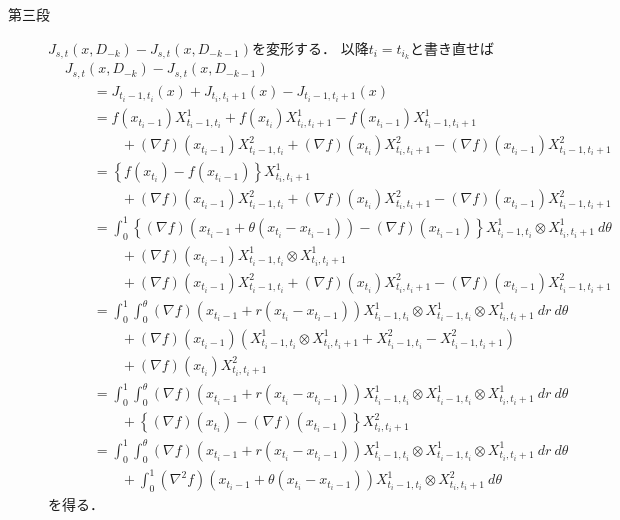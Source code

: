\begin{prf}
\begin{description}
			\item[第三段]
				$J_{s,t}(x,D_{-k}) - J_{s,t}(x,D_{-k-1})$を変形する．
				以降$t_i = t_{i_k}$と書き直せば
				\begin{align}
					&J_{s,t}(x,D_{-k}) - J_{s,t}(x,D_{-k-1}) \\
					&\qquad = J_{t_i-1,t_i}(x) + J_{t_i,t_i+1}(x) - J_{t_i-1,t_i+1}(x) \\
					&\qquad = f(x_{t_i-1}) X^1_{t_i-1,t_i} + f(x_{t_i}) X^1_{t_i,t_i+1} - f(x_{t_i-1}) X^1_{t_i-1,t_i+1} \\
						&\qquad \qquad + (\nabla f)(x_{t_i-1})X^2_{t_i-1,t_i} + (\nabla f)(x_{t_i})X^2_{t_i,t_i+1} - (\nabla f)(x_{t_i-1})X^2_{t_i-1,t_i+1} \\
					&\qquad = \left\{ f(x_{t_i}) - f(x_{t_i-1}) \right\} X^1_{t_i,t_i+1} \\
						&\qquad \qquad + (\nabla f)(x_{t_i-1})X^2_{t_i-1,t_i} + (\nabla f)(x_{t_i})X^2_{t_i,t_i+1} - (\nabla f)(x_{t_i-1})X^2_{t_i-1,t_i+1} \\
					&\qquad = \int_0^1 \left\{ (\nabla f)(x_{t_i-1} + \theta(x_{t_i} - x_{t_i-1})) - (\nabla f)(x_{t_i-1}) \right\} X^1_{t_i-1,t_i} \otimes X^1_{t_i,t_i+1}\ d\theta \\
						&\qquad \qquad + (\nabla f)(x_{t_i-1})X^1_{t_i-1,t_i} \otimes X^1_{t_i,t_i+1} \\
						&\qquad \qquad + (\nabla f)(x_{t_i-1})X^2_{t_i-1,t_i} + (\nabla f)(x_{t_i})X^2_{t_i,t_i+1} - (\nabla f)(x_{t_i-1})X^2_{t_i-1,t_i+1} \\
					&\qquad = \int_0^1 \int_0^\theta (\nabla f)(x_{t_i-1} + r(x_{t_i} - x_{t_i-1}))  X^1_{t_i-1,t_i} \otimes X^1_{t_i-1,t_i} \otimes X^1_{t_i,t_i+1}\ dr\ d\theta \\
						&\qquad \qquad + (\nabla f)(x_{t_i-1})\left( X^1_{t_i-1,t_i} \otimes X^1_{t_i,t_i+1} + X^2_{t_i-1,t_i} - X^2_{t_i-1,t_i+1} \right) \\
						&\qquad \qquad + (\nabla f)(x_{t_i})X^2_{t_i,t_i+1} \\
					&\qquad = \int_0^1 \int_0^\theta (\nabla f)(x_{t_i-1} + r(x_{t_i} - x_{t_i-1}))  X^1_{t_i-1,t_i} \otimes X^1_{t_i-1,t_i} \otimes X^1_{t_i,t_i+1}\ dr\ d\theta \\
						&\qquad \qquad + \left\{ (\nabla f)(x_{t_i}) - (\nabla f)(x_{t_i-1}) \right\}X^2_{t_i,t_i+1} \\
					&\qquad = \int_0^1 \int_0^\theta (\nabla f)(x_{t_i-1} + r(x_{t_i} - x_{t_i-1}))  X^1_{t_i-1,t_i} \otimes X^1_{t_i-1,t_i} \otimes X^1_{t_i,t_i+1}\ dr\ d\theta \\
						&\qquad \qquad + \int_0^1 (\nabla^2 f)(x_{t_i-1} + \theta(x_{t_i} - x_{t_i-1})) X^1_{t_i-1,t_i} \otimes X^2_{t_i,t_i+1}\ d\theta
				\end{align}
				を得る．
				

\end{description}
\end{prf}
